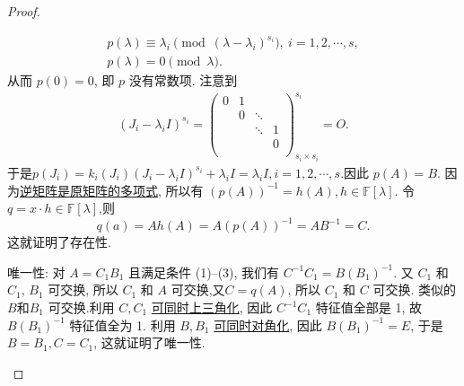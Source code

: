 \documentclass[../../main.tex]{subfiles}%
\begin{document}
\begin{proof}
\begin{enumerate}
\begin{gather*}
p(\lambda) \equiv \lambda_i \pmod{(\lambda - \lambda_i)^{s_i}},\ i = 1, 2, \cdots, s,
\\
p(\lambda) = 0 \pmod{\lambda}.
\end{gather*}
从而  \( p(0) = 0 \), 即 \( p \) 没有常数项.
注意到
\begin{align*}
\left( J_i-\lambda _iI \right) ^{s_i}=\left( \begin{matrix}
0&		1&		&		\\
&		0&		\ddots&		\\
&		&		\ddots&		1\\
&		&		&		0\\
\end{matrix} \right) _{s_i\times s_i}^{s_i}=O.
\end{align*}
于是$p(J_i)=k_i\left( J_i \right) \left( J_i-\lambda _iI \right) ^{s_i}+\lambda _iI=\lambda _iI,i=1,2,\cdots ,s.$因此 \( p(A) = B.\)
因为\hyperref[proposition:矩阵的逆可以用其多项式表示]{逆矩阵是原矩阵的多项式}, 所以有 \( (p(A))^{-1} = h(A), h \in \mathbb{F}[\lambda] \). 令 \( q = x \cdot h \in \mathbb{F}[\lambda] \),则
$$
q(a)=Ah(A)=A(p(A))^{-1}=AB^{-1}=C.
$$
这就证明了存在性.

{\heiti 唯一性:} 对 \( A = C_1B_1 \) 且满足条件 (1)--(3), 我们有 \( C^{-1}C_1 = B(B_1)^{-1} \). 又 \( C_1 \) 和 \( C_1 \), \( B_1 \) 可交换, 所以 \( C_1 \) 和 \( A \) 可交换,又$C=q(A)$, 所以 \( C_1 \) 和 \( C \) 可交换. 类似的 \( B\)和\( B_1 \) 可交换.利用 \( C, C_1 \) \hyperref[proposition:一族两两可交换的一般域上的矩阵可同时上三角化]{可同时上三角化}, 因此 \( C^{-1}C_1 \) 特征值全部是 1, 故 \( B(B_1)^{-1} \) 特征值全为 1. 利用 \( B, B_1 \) \hyperref[proposition:一族两两可交换的可对角化矩阵可同时相似对角化]{可同时对角化}, 因此 \( B(B_1)^{-1} = E \), 于是 \( B = B_1, C = C_1 \), 这就证明了唯一性.
\end{enumerate}

\end{proof}
\end{document}
